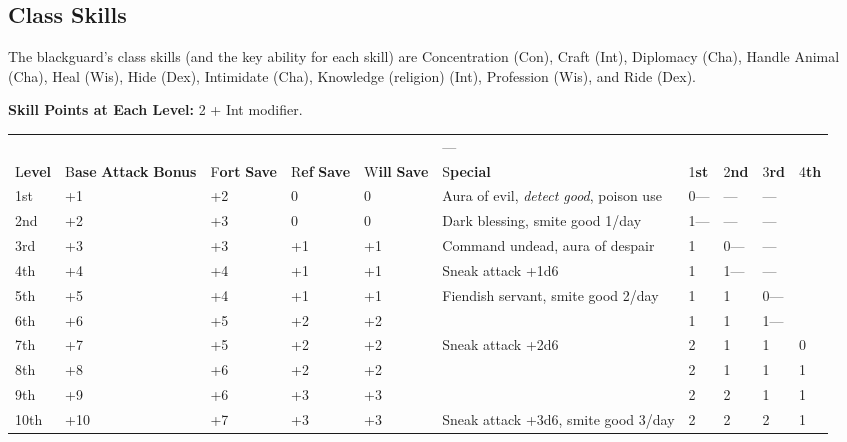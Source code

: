 \documentclass{article}
\begin{document}
\subsection*{\textbf{Class Skills}}

The blackguard's class skills (and the key ability for each skill) are Concentration 
(Con), Craft (Int), Diplomacy (Cha), Handle Animal (Cha), Heal (Wis), Hide (Dex), 
Intimidate (Cha), Knowledge (religion) (Int), Profession (Wis), and Ride (Dex). 

\textbf{Skill Points at Each Level:} 2 + Int modifier.

\vspace{12pt}
\begin{tabular}{|>{\raggedright}p{19pt}|>{\raggedright}p{21pt}|>{\raggedright}p{15pt}|>{\raggedright}p{15pt}|>{\raggedright}p{15pt}|>{\raggedright}p{98pt}|>{\raggedright}p{10pt}|>{\raggedright}p{12pt}|>{\raggedright}p{11pt}|>{\raggedright}p{11pt}|}
\hline
\multicolumn{10}{|p{230pt}|}{T\textbf{able: The Blackguard}}\tabularnewline
\hline
  &   &   &   &   &  --- & \multicolumn{4}{p{45pt}|}{ \textbf{Spells per Day ---}}\tabularnewline
\hline
L\textbf{evel} & B\textbf{ase}\linebreak{}
\textbf{Attack}\linebreak{}
\textbf{Bonus} & F\textbf{ort}\linebreak{}
\textbf{Save} & R\textbf{ef}\linebreak{}
\textbf{Save} & W\textbf{ill}\linebreak{}
\textbf{Save} & S\textbf{pecial} & 1\textbf{st} & 2\textbf{nd} & 3\textbf{rd} & 4\textbf{th}\tabularnewline
\hline
1st & +1 & +2 & 0 & 0 & Aura of evil, \textit{detect good}, poison use & 0--- & --- & --- & \tabularnewline
\hline
2nd & +2 & +3 & 0 & 0 & Dark blessing, smite good 1/day & 1--- & --- & --- & \tabularnewline
\hline
3rd & +3 & +3 & +1 & +1 & Command undead, aura of despair & 1 & 0--- & --- & \tabularnewline
\hline
4th & +4 & +4 & +1 & +1 & Sneak attack +1d6 & 1 & 1--- & --- & \tabularnewline
\hline
5th & +5 & +4 & +1 & +1 & Fiendish servant, smite good 2/day & 1 & 1 & 0--- & \tabularnewline
\hline
6th & +6 & +5 & +2 & +2 &  & 1 & 1 & 1--- & \tabularnewline
\hline
7th & +7 & +5 & +2 & +2 & Sneak attack +2d6 & 2 & 1 & 1 & 0\tabularnewline
\hline
8th & +8 & +6 & +2 & +2 &  & 2 & 1 & 1 & 1\tabularnewline
\hline
9th & +9 & +6 & +3 & +3 &  & 2 & 2 & 1 & 1\tabularnewline
\hline
10th & +10 & +7 & +3 & +3 & Sneak attack +3d6, smite good 3/day & 2 & 2 & 2 & 1\tabularnewline
\hline
\end{tabular}
\end{document}
